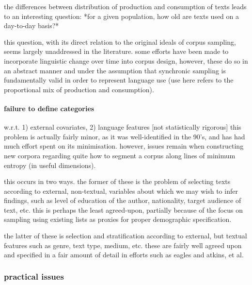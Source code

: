 the differences between distribution of production and consumption of texts leads to an interesting question: *for a given population, how old are texts used on a day-to-day basis?*

this question, with its direct relation to the original ideals of corpus sampling, seems largely unaddressed in the literature.  some efforts have been made to incorporate linguistic change over time into corpus design, however, these do so in an abstract manner and under the assumption that synchronic sampling is fundamentally valid in order to represent language use (use here refers to the proportional mix of production and consumption).







\paragraph{ failure to define categories }
w.r.t. 1) external covariates, 2) language features [not statistically rigorous]
this problem is actually fairly minor, as it was well-identified in the 90's, and has had much effort spent on its minimisation.  however, issues remain when constructing new corpora regarding quite how to segment a corpus along lines of minimum entropy (in useful dimensions).

this occurs in two ways.  the former of these is the problem of selecting texts according to external, non-textual, variables about which we may wish to infer findings, such as level of education of the author, nationality, target audience of text, etc.  this is perhaps the least agreed-upon, partially because of the focus on sampling using existing lists as proxies for proper demographic specification.

the latter of these is selection and stratification according to external, but textual features such as genre, text type, medium, etc.  these are fairly well agreed upon and specified in a fair amount of detail in efforts such as eagles and atkins, et al.  








\subsubsection{practical issues}

